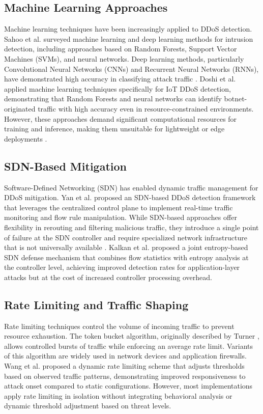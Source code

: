 \documentclass[conference]{IEEEtran}
\begin{document}
\subsection{Machine Learning Approaches}

Machine learning techniques have been increasingly applied to DDoS detection. Sahoo et al. \cite{b5} surveyed machine learning and deep learning methods for intrusion detection, including approaches based on Random Forests, Support Vector Machines (SVMs), and neural networks. Deep learning methods, particularly Convolutional Neural Networks (CNNs) and Recurrent Neural Networks (RNNs), have demonstrated high accuracy in classifying attack traffic \cite{b19}. Doshi et al. \cite{b11} applied machine learning techniques specifically for IoT DDoS detection, demonstrating that Random Forests and neural networks can identify botnet-originated traffic with high accuracy even in resource-constrained environments. However, these approaches demand significant computational resources for training and inference, making them unsuitable for lightweight or edge deployments \cite{b6}.

\subsection{SDN-Based Mitigation}

Software-Defined Networking (SDN) has enabled dynamic traffic management for DDoS mitigation. Yan et al. \cite{b6} proposed an SDN-based DDoS detection framework that leverages the centralized control plane to implement real-time traffic monitoring and flow rule manipulation. While SDN-based approaches offer flexibility in rerouting and filtering malicious traffic, they introduce a single point of failure at the SDN controller and require specialized network infrastructure that is not universally available \cite{b7}. Kalkan et al. \cite{b14} proposed a joint entropy-based SDN defense mechanism that combines flow statistics with entropy analysis at the controller level, achieving improved detection rates for application-layer attacks but at the cost of increased controller processing overhead.

\subsection{Rate Limiting and Traffic Shaping}

Rate limiting techniques control the volume of incoming traffic to prevent resource exhaustion. The token bucket algorithm, originally described by Turner \cite{b8}, allows controlled bursts of traffic while enforcing an average rate limit. Variants of this algorithm are widely used in network devices and application firewalls. Wang et al. \cite{b15} proposed a dynamic rate limiting scheme that adjusts thresholds based on observed traffic patterns, demonstrating improved responsiveness to attack onset compared to static configurations. However, most implementations apply rate limiting in isolation without integrating behavioral analysis or dynamic threshold adjustment based on threat levels.
\end{document}
